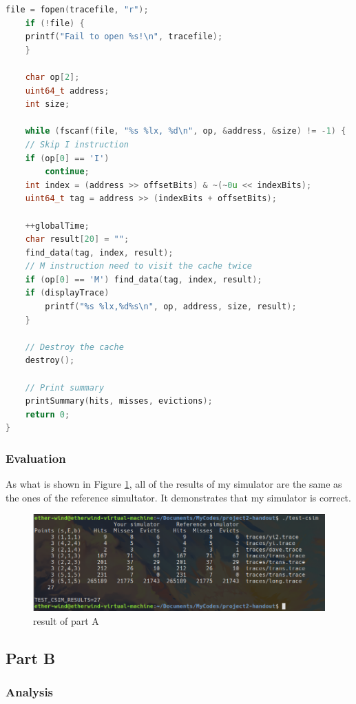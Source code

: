 \documentclass{article}
\begin{document}
\begin{lstlisting}[language=c++, caption={csim.c}, label={cd:1}]
    file = fopen(tracefile, "r");
    if (!file) {
    printf("Fail to open %s!\n", tracefile);
    }

    char op[2];
    uint64_t address;
    int size;

    while (fscanf(file, "%s %lx, %d\n", op, &address, &size) != -1) {
    // Skip I instruction
    if (op[0] == 'I')
        continue;
    int index = (address >> offsetBits) & ~(~0u << indexBits);
    uint64_t tag = address >> (indexBits + offsetBits);

    ++globalTime;
    char result[20] = "";
    find_data(tag, index, result);
    // M instruction need to visit the cache twice
    if (op[0] == 'M') find_data(tag, index, result);
    if (displayTrace)
        printf("%s %lx,%d%s\n", op, address, size, result);
    }

    // Destroy the cache
    destroy();

    // Print summary
    printSummary(hits, misses, evictions);
    return 0;
}
\end{lstlisting}

\subsubsection{Evaluation}

As what is shown in Figure \ref{fig:1}, all of the results of my simulator are the same as the ones of the reference simultator. It demonstrates that my simulator is correct. 

\begin{figure}[htbp]
    \centering
    \includegraphics[width=0.7\linewidth]{csim.png}
    \caption{result of part A}\label{fig:1}
\end{figure}

\subsection{Part B}
 
\subsubsection{Analysis}
\end{document}
